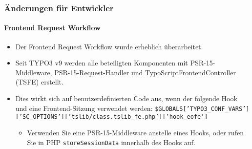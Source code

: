 
\begin{frame}[fragile]
	\frametitle{Änderungen für Entwickler}
	\framesubtitle{Frontend Request Workflow}

	\lstset{basicstyle=\smaller\ttfamily}

	\begin{itemize}
		\item Der Frontend Request Workflow wurde erheblich überarbeitet.

		\item Seit TYPO3 v9 werden alle beteiligten Komponenten mit PSR-15-Middleware, PSR-15-Request-Handler und 
			TypoScriptFrontendController (TSFE) erstellt.

		\item Dies wirkt sich auf benutzerdefinierten Code aus, wenn der folgende Hook und eine Frontend-Sitzung verwendet werden:\newline
			{\fontsize{7}{8}\selectfont\texttt{\$GLOBALS['TYPO3\_CONF\_VARS']['SC\_OPTIONS']['tslib/class.tslib\_fe.php']['hook\_eofe']}}

			\begin{itemize}\smaller
				\item[\ding{228}] Verwenden Sie eine PSR-15-Middleware anstelle eines Hooks, oder rufen Sie in PHP \texttt{storeSessionData}
				innerhalb des Hooks auf.
			\end{itemize}\normalsize

	\end{itemize}

\end{frame}


